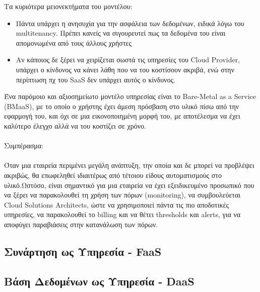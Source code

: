 \documentclass{article}
\begin{document}
 Τα κυριότερα μειονεκτήματα του μοντέλου:
\begin{itemize}
\item Πάντα υπάρχει η ανησυχία για την ασφάλεια των δεδομένων, ειδικά λόγω του multitenancy. Πρέπει κανείς να σιγουρευτεί πως τα δεδομένα του είναι απομονωμένα από τους άλλους χρήστες
\item Αν κάποιος δε ξέρει να χειρίζεται σωστά τις υπηρεσίες του Cloud Provider, υπάρχει ο κίνδυνος να κάνει λάθη που να του κοστίσουν ακριβά, ενώ στην περίπτωση πχ του SaaS δεν υπάρχει αυτός ο κίνδυνος.
\end{itemize}
Ένα παρόμοιο και αξιοσημείωτο μοντέλο υπηρεσίας είναι το Bare-Metal as a Service (BMaaS), με το οποίο ο χρήστης έχει άμεση πρόσβαση στο υλικό πίσω από την εφαρμογή του, και όχι σε μια εικονοποιημένη μορφή του, με αποτέλεσμα να έχει καλύτερο έλεγχο αλλά να του κοστίζει σε χρόνο. \\ \\
Συμπέρασμα: \\ \\
Όταν μια εταιρεία περιμένει μεγάλη ανάπτυξη, την οποία και δε μπορεί να προβλέψει ακριβώς, θα επωφεληθεί ιδιαιτέρως από τέτοιου είδους αυτοματισμούς στο υλικό.Ωστόσο, είναι σημαντικό για μια εταιρεία να έχει εξειδικευμένο προσωπικό που να ξέρει να παρακολουθεί τη χρήση των πόρων (monitoring), να συμβουλεύεται Cloud Solutions Architects, ώστε να χρησιμοποιεί πάντα τις πιο αποδοτικές υπηρεσίες, να παρακολουθεί το billing και να θέτει thresholds και alerts, για να αποφύγει παραβιάσεις στην κατανάλωση των πόρων.


\subsection{Συνάρτηση ως Υπηρεσία - FaaS}

\subsection{Βάση Δεδομένων ως Υπηρεσία - DaaS}
\end{document}
